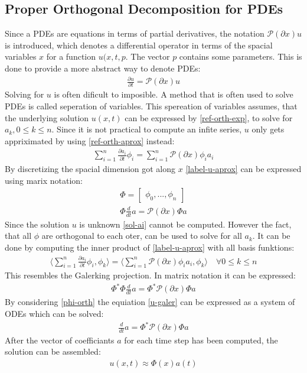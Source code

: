 \subsection{Proper Orthogonal Decomposition for PDEs}
Since a PDEs are equations in terms of partial derivatives, the notation \(\mathscr{P}(\partial x) u\) is introduced, which denotes a differential operator in terms of the spacial variables \(x\) for a function \(u(x,t,p\).
The vector \(p\) contains some parameters.
This is done to provide a more abstract way to denote PDEs:
\begin{gather}
\frac{\partial u}{\partial t} = \mathscr{P}(\partial x) u
\end{gather}
\cite{Gustafsson2011f}
Solving for \(u\) is often dificult to imposible.
A method that is often used to solve PDEs is called seperation of variables.
This spereation of variables assumes, that the underlying solution \(u(x, t)\) can be expressed by \ref{ref-orth-exp}, to solve for \(a_k, 0 \leq k \leq n\).
Since it is not practical to compute an infite series, \(u\) only gets appriximated by using \ref{ref-orth-aprox} instead:
\begin{gather}
\sum_{i = 1} ^{n} \frac{\partial a_i}{\partial t} \phi_i = \sum_{i = 1} ^{n} \mathscr{P}(\partial x) \phi_i a_i \label{label-u-aprox} 
\end{gather}
By discretizing the spacial dimension got along \(x\) \ref{label-u-aprox} can be expressed using marix notation:
\begin{gather}
\Phi = \begin{bmatrix}
\phi_0, ..., \phi_n
\end{bmatrix} \label{mat-phi}\\
\Phi \frac{d}{dt}a = \mathscr{P}(\partial x) \Phi a
\end{gather}
Since the solution \(u\) is unknown \ref{sol-ai} cannot be computed.
However the fact, that all \(\phi\) are orthogonal to each oter, can be used to solve for all \(a_k\).
It can be done by computing the inner product of \ref{label-u-aprox} with all basis funktions:
\begin{gather}
\langle \sum_{i = 1} ^{n} \frac{\partial a_i}{\partial t} \phi_i, \phi_k \rangle = \langle\sum_{i = 1} ^{n} \mathscr{P}(\partial x) \phi_i a_i, \phi_k \rangle \quad \forall 0 \leq k \leq n \label{u-galer}
\end{gather}
This resembles the Galerking projection.
In matrix notation it can be expressed:
\begin{gather}
\Phi^{*}\Phi \frac{d}{dt}a = \Phi^{*}\mathscr{P}(\partial x) \Phi a
\end{gather}
By considering \ref{phi-orth}  the equiation \ref{u-galer} can be expressed as a system of ODEs which can be solved:
\begin{gather}
\frac{d}{dt} a = \Phi^{*}\mathscr{P}(\partial x) \Phi a
\end{gather}
After the vector of coefficiants \(a\) for each time step has been computed, the solution can be assembled:
\begin{gather}
u(x, t) \approx \Phi(x)a(t) \label{u-aprox-pod}
\end{gather} 
\cite{brunton_kutz_2019c}

